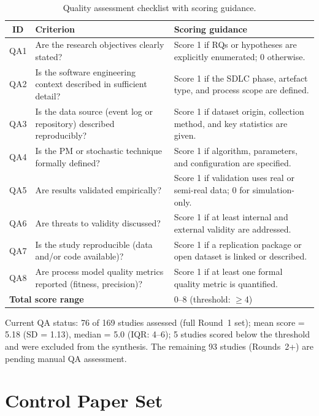 \begin{table}[htbp]
\centering
\caption{Quality assessment checklist with scoring guidance.}
\label{tab:app-qa-full}
\small
\setlength{\tabcolsep}{4pt}
\begin{tabular}{c p{5.5cm} p{5.5cm}}
\toprule
\textbf{ID} & \textbf{Criterion} & \textbf{Scoring guidance} \\
\midrule
QA1 & Are the research objectives clearly stated? &
  Score 1 if RQs or hypotheses are explicitly enumerated; 0 otherwise. \\
QA2 & Is the software engineering context described in sufficient detail? &
  Score 1 if the SDLC phase, artefact type, and process scope are defined. \\
QA3 & Is the data source (event log or repository) described reproducibly? &
  Score 1 if dataset origin, collection method, and key statistics are given. \\
QA4 & Is the PM or stochastic technique formally defined? &
  Score 1 if algorithm, parameters, and configuration are specified. \\
QA5 & Are results validated empirically? &
  Score 1 if validation uses real or semi-real data; 0 for simulation-only. \\
QA6 & Are threats to validity discussed? &
  Score 1 if at least internal and external validity are addressed. \\
QA7 & Is the study reproducible (data and/or code available)? &
  Score 1 if a replication package or open dataset is linked or described. \\
QA8 & Are process model quality metrics reported (fitness, precision)? &
  Score 1 if at least one formal quality metric is quantified. \\
\midrule
\multicolumn{2}{l}{\textbf{Total score range}} & 0--8 (threshold: $\geq$4) \\
\bottomrule
\end{tabular}
\end{table}

Current QA status: 76 of 169 studies assessed (full Round~1 set); mean
score = 5.18 (SD = 1.13), median = 5.0 (IQR: 4--6); 5 studies scored
below the threshold and were excluded from the synthesis. The remaining
93 studies (Rounds~2+) are pending manual QA assessment.

\section{Control Paper Set}
\label{app:slr-control}

